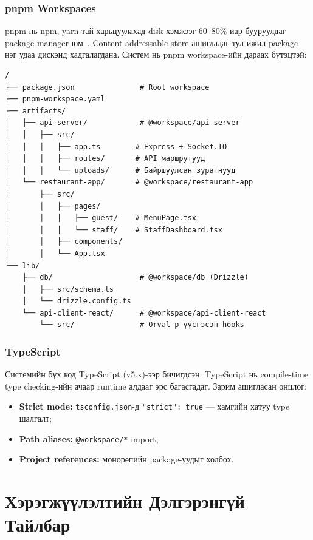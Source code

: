 \documentclass[12pt,a4paper]{article}
\begin{document}
\subsubsection{pnpm Workspaces}

pnpm нь npm, yarn-тай харьцуулахад disk хэмжээг 60--80\%-иар
бууруулдаг package manager юм~\cite{pnpm2024}. Content-addressable
store ашигладаг тул ижил package нэг удаа дискэнд хадгалагдана.
Систем нь pnpm workspace-ийн дараах бүтэцтэй:

\begin{lstlisting}[caption=pnpm workspace бүтэц]
/
├── package.json               # Root workspace
├── pnpm-workspace.yaml
├── artifacts/
│   ├── api-server/            # @workspace/api-server
│   │   ├── src/
│   │   │   ├── app.ts        # Express + Socket.IO
│   │   │   ├── routes/       # API маршрутууд
│   │   │   └── uploads/      # Байршуулсан зурагнууд
│   └── restaurant-app/       # @workspace/restaurant-app
│       ├── src/
│       │   ├── pages/
│       │   │   ├── guest/    # MenuPage.tsx
│       │   │   └── staff/    # StaffDashboard.tsx
│       │   ├── components/
│       │   └── App.tsx
└── lib/
    ├── db/                    # @workspace/db (Drizzle)
    │   ├── src/schema.ts
    │   └── drizzle.config.ts
    └── api-client-react/      # @workspace/api-client-react
        └── src/               # Orval-р үүсгэсэн hooks
\end{lstlisting}

\subsubsection{TypeScript}

Системийн бүх код TypeScript (v5.x)-ээр бичигдсэн.
TypeScript нь compile-time type checking-ийн ачаар runtime
алдааг эрс багасгадаг. Зарим ашигласан онцлог:

\begin{itemize}
  \item \textbf{Strict mode:} \texttt{tsconfig.json}-д
        \texttt{"strict": true} --- хамгийн хатуу type шалгалт;
  \item \textbf{Path aliases:} \texttt{@workspace/*} import;
  \item \textbf{Project references:} монорепийн package-уудыг
        холбох.
\end{itemize}

\section{Хэрэгжүүлэлтийн Дэлгэрэнгүй Тайлбар}
\label{sec:impl}
\end{document}

